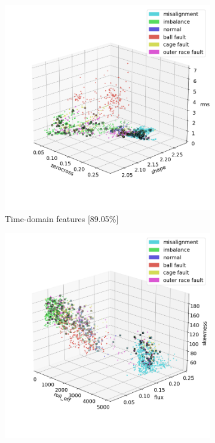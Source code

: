 \begin{figure}[h]
    \centering
    \begin{subfigure}[b]{0.48\textwidth}
        \includegraphics[width=\textwidth]{assets/results/labels/TD.png}
        \caption{Time-domain features [89.05\%]}
    \end{subfigure}
    \hfill
    \begin{subfigure}[b]{0.48\textwidth}
        \includegraphics[width=\textwidth]{assets/results/labels/FD.png}

\end{subfigure}
\end{figure}
